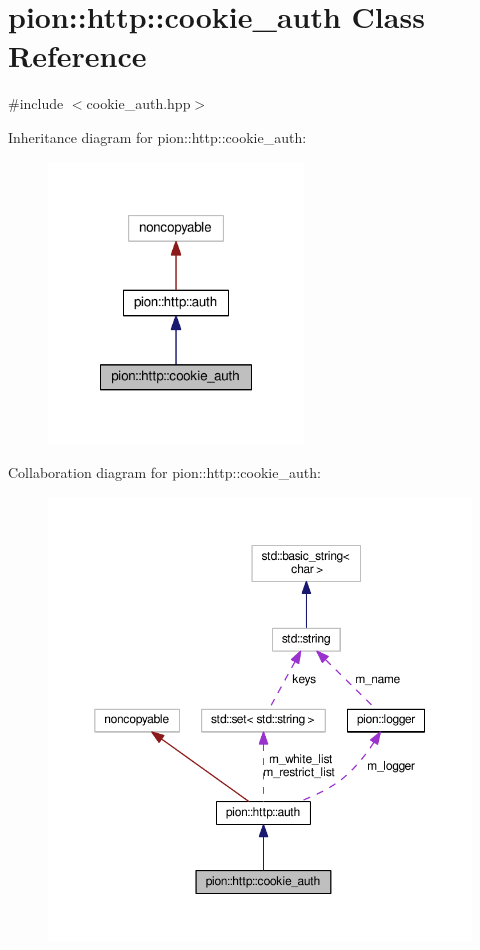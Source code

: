 \hypertarget{classpion_1_1http_1_1cookie__auth}{\section{pion\-:\-:http\-:\-:cookie\-\_\-auth Class Reference}
\label{classpion_1_1http_1_1cookie__auth}
}


{\ttfamily \#include $<$cookie\-\_\-auth.\-hpp$>$}



Inheritance diagram for pion\-:\-:http\-:\-:cookie\-\_\-auth\-:
\nopagebreak
\begin{figure}[H]
\begin{center}
\leavevmode
\includegraphics[width=192pt]{classpion_1_1http_1_1cookie__auth__inherit__graph}
\end{center}
\end{figure}


Collaboration diagram for pion\-:\-:http\-:\-:cookie\-\_\-auth\-:
\nopagebreak
\begin{figure}[H]
\begin{center}
\leavevmode
\includegraphics[width=350pt]{classpion_1_1http_1_1cookie__auth__coll__graph}
\end{center}
\end{figure}
